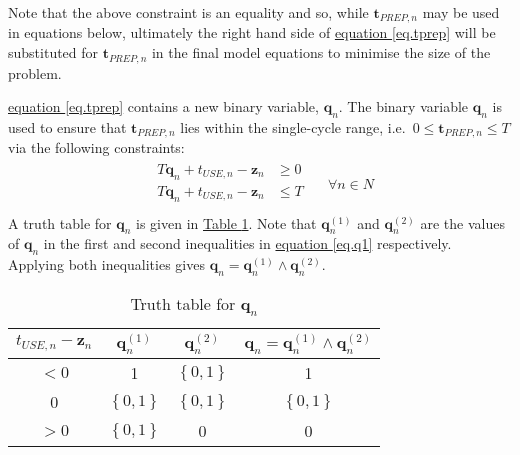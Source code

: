 Note that the above constraint is an equality and so, while
$\boldsymbol{t}_{\mathit{PREP},n}$ may be used in equations below, ultimately
the right hand side of \hyperref[eq.tprep]{equation \ref*{eq.tprep}}
will be substituted for $\boldsymbol{t}_{\mathit{PREP},n}$ in the final model
equations to minimise the size of the problem.

\hyperref[eq.tprep]{equation \ref*{eq.tprep}} contains a new binary 
variable, $\boldsymbol{q}_{n}$.
The binary variable $\boldsymbol{q}_{n}$ is used to ensure that
$\boldsymbol{t}_{\mathit{PREP},n}$ lies within the single-cycle range, i.e.\
$0 \le \boldsymbol{t}_{\mathit{PREP},n} \le T$ via the following constraints:
\begin{equation}
    \begin{split}
        \begin{alignedat}{2}
            T \boldsymbol{q}_{n} + t_{\mathit{USE},n} - \boldsymbol{z}_{n} &\ge
            0\\
            T \boldsymbol{q}_{n} + t_{\mathit{USE},n} - \boldsymbol{z}_{n} &\le
            T\\
        \end{alignedat}
    \end{split}
    \quad \forall n \in N
    \label{eq.q1}
\end{equation}
A truth table for $\boldsymbol{q}_{n}$ is given in
\hyperref[tbl.truthq]{Table \ref*{tbl.truthq}}.
Note that $\boldsymbol{q}_{n}^{\left( 1 \right)}$ and 
$\boldsymbol{q}_{n}^{\left( 2 \right)}$ are the values of $\boldsymbol{q}_{n}$
in the first and second inequalities in \hyperref[eq.q1]{equation \ref*{eq.q1}}
respectively. Applying both inequalities gives
$\boldsymbol{q}_{n} = \boldsymbol{q}_{n}^{\left( 1 \right)} \land
 \boldsymbol{q}_{n}^{\left( 2 \right)}$.
\begin{table}[h!]
    \centering
    \caption{Truth table for $\boldsymbol{q}_{n}$}
    \label{tbl.truthq}
    \begin{tabular}{c | c c | c}
        $t_{\mathit{USE},n} - \boldsymbol{z}_{n}$
        & $\boldsymbol{q}_{n}^{\left( 1 \right)}$
        & $\boldsymbol{q}_{n}^{\left( 2 \right)}$
        & $\boldsymbol{q}_{n} = \boldsymbol{q}_{n}^{\left( 1 \right)} \land
        \boldsymbol{q}_{n}^{\left( 2 \right)}$\\ \hline
        $<0$ & 1 & $\left\{ 0,1 \right\}$ & 1\\
        0 & $\left\{ 0,1 \right\}$ & $\left\{ 0,1 \right\}$
            & $\left\{ 0,1 \right\}$\\
        $>0$ & $\left\{ 0,1 \right\}$ & 0 & 0\\
    \end{tabular}
\end{table}

